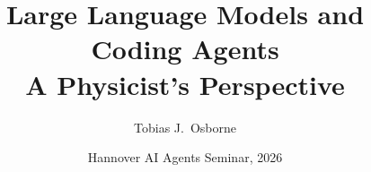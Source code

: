 \documentclass[12pt,oneside]{amsart}
\title[Large Language Models and Coding Agents]{Large Language Models and Coding Agents\\[0.3em]
  {\large A Physicist's Perspective}}
\author{Tobias J.\ Osborne}
\date{Hannover AI Agents Seminar, 2026}
\begin{document}
\maketitle

\tableofcontents
\bigskip



















\end{document}
